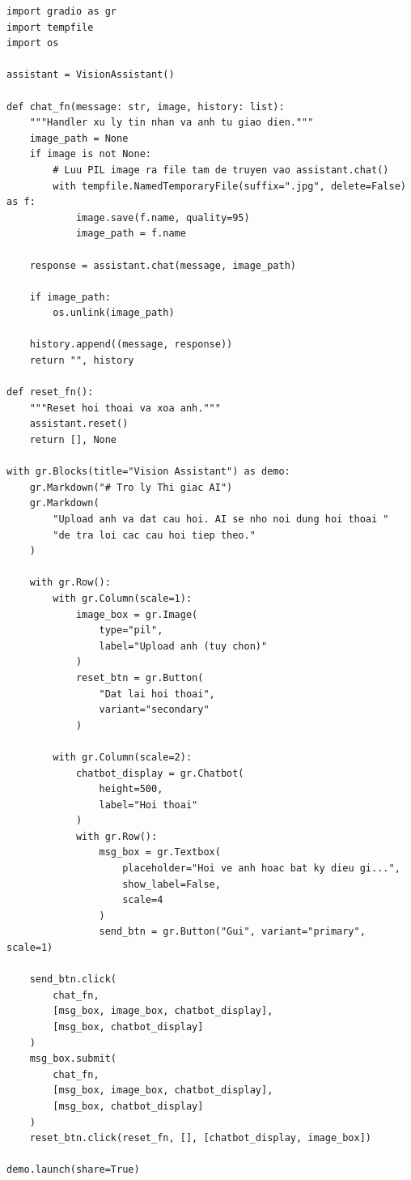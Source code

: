 \begin{verbatim}
import gradio as gr
import tempfile
import os

assistant = VisionAssistant()

def chat_fn(message: str, image, history: list):
    """Handler xu ly tin nhan va anh tu giao dien."""
    image_path = None
    if image is not None:
        # Luu PIL image ra file tam de truyen vao assistant.chat()
        with tempfile.NamedTemporaryFile(suffix=".jpg", delete=False) as f:
            image.save(f.name, quality=95)
            image_path = f.name

    response = assistant.chat(message, image_path)

    if image_path:
        os.unlink(image_path)

    history.append((message, response))
    return "", history

def reset_fn():
    """Reset hoi thoai va xoa anh."""
    assistant.reset()
    return [], None

with gr.Blocks(title="Vision Assistant") as demo:
    gr.Markdown("# Tro ly Thi giac AI")
    gr.Markdown(
        "Upload anh va dat cau hoi. AI se nho noi dung hoi thoai "
        "de tra loi cac cau hoi tiep theo."
    )

    with gr.Row():
        with gr.Column(scale=1):
            image_box = gr.Image(
                type="pil",
                label="Upload anh (tuy chon)"
            )
            reset_btn = gr.Button(
                "Dat lai hoi thoai",
                variant="secondary"
            )

        with gr.Column(scale=2):
            chatbot_display = gr.Chatbot(
                height=500,
                label="Hoi thoai"
            )
            with gr.Row():
                msg_box = gr.Textbox(
                    placeholder="Hoi ve anh hoac bat ky dieu gi...",
                    show_label=False,
                    scale=4
                )
                send_btn = gr.Button("Gui", variant="primary", scale=1)

    send_btn.click(
        chat_fn,
        [msg_box, image_box, chatbot_display],
        [msg_box, chatbot_display]
    )
    msg_box.submit(
        chat_fn,
        [msg_box, image_box, chatbot_display],
        [msg_box, chatbot_display]
    )
    reset_btn.click(reset_fn, [], [chatbot_display, image_box])

demo.launch(share=True)
\end{verbatim}

